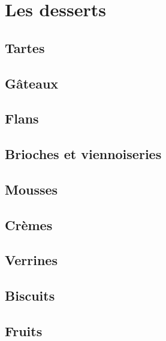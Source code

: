 \documentclass[A4paper,twoside, 12pt]{book}
\begin{document}
\part{Les desserts}
	\chapter{Tartes}


	\chapter{G\^ateaux}







		
	\chapter{Flans}


	\chapter{Brioches et viennoiseries}




	\chapter{Mousses}
	\chapter{Cr\`emes}


	\chapter{Verrines}
	
	\chapter{Biscuits}


	\chapter{Fruits}

\end{document}
